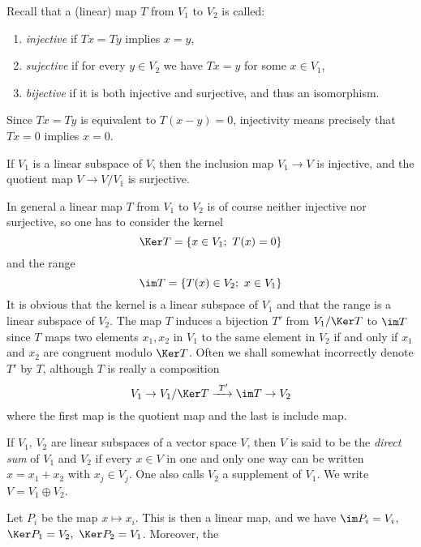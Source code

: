 Recall that a (linear) map $T$ from $V_1$ to $V_2$ is called:
\begin{enumerate}[label=(\arabic*),labelindent=\parindent,leftmargin=*]
\item \emph{injective} if $Tx=Ty$ implies $x=y$,
\item \emph{sujective} if for every $y\in V_2$ we have $Tx=y$ for some
  $x\in V_1$,
\item \emph{bijective} if it is both injective and surjective, and
  thus an isomorphism.
\end{enumerate}
Since $Tx=Ty$ is equivalent to $T(x-y)=0$, injectivity means precisely
that $Tx=0$ implies $x=0$.
\begin{exa}
  If $V_1$ is a linear subspace of $V$, then the inclusion map $V_1\to
  V$ is injective, and the quotient map $V\to V/V_1$ is surjective.
\end{exa}
In general a linear map $T$ from $V_1$ to $V_2$ is of course neither
injective nor surjective, so one has to consider the kernel
\begin{displaymath}
  \Ker T=\left\{ x\in V_1;\ T(x)=0 \right\}
\end{displaymath}
and the range
\begin{displaymath}
  \im T=\left\{ T(x)\in V_2;\ x\in V_1\right\}
\end{displaymath}
It is obvious that the kernel is a linear subspace of $V_1$ and that
the range is a linear subspace of $V_2$. The map $T$ induces a bijection
$T'$ from $V_1/\Ker T$ to $\im T$ since $T$ maps two elements
$x_1,x_2$ in $V_1$ to the same element in $V_2$ if and only if $x_1$
and $x_2$ are congruent modulo $\Ker T$. Often we shall somewhat
incorrectly denote $T'$ by $T$, although $T$ is really a composition
\begin{displaymath}
  V_1\to V_1/\Ker T\xrightarrow{\ T'} \im T\to V_2
\end{displaymath}
where the first map is the quotient map and the last is include map.
\begin{dfn}\label{def:direct-sum}
  If $V_1,\,V_2$ are linear subspaces of a vector space $V$, then $V$
  is said to be the \emph{direct sum} of $V_1$ and $V_2$ if every
  $x\in V$ in one and only one way can be written $x=x_1+x_2$ with
  $x_j\in V_j$. One also calls $V_2$ a supplement of $V_1$. We write
  $V=V_1\oplus V_2$.
\end{dfn}
Let $P_i$ be the map $x\mapsto x_i$. This is then a linear map, and we
have $\im P_i=V_i$, \linebreak $\Ker P_1= V_2,\ \Ker P_2=V_1$. Moreover, the
